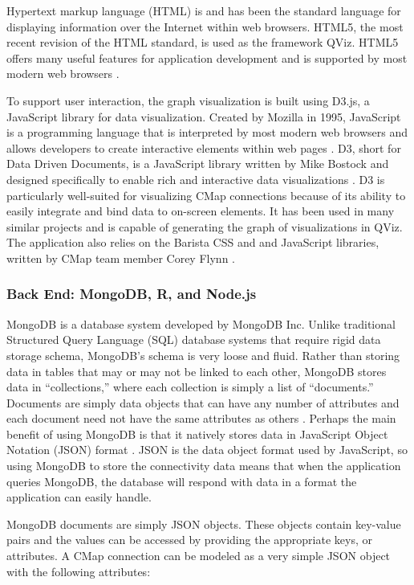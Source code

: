 \documentclass[12pt]{article}
\begin{document}
Hypertext markup language (HTML) is and has been the standard language for displaying information over the Internet within web browsers. HTML5, the most recent revision of the HTML standard, is used as the framework QViz. HTML5 offers many useful features for application development and is supported by most modern web browsers \cite{w3c_html5}. 

To support user interaction, the graph visualization is built using D3.js, a JavaScript library for data visualization. Created by Mozilla in 1995, JavaScript is a programming language that is interpreted by most modern web browsers and allows developers to create interactive elements within web pages \cite{mozilla_javascript}. D3, short for Data Driven Documents, is a JavaScript library written by Mike Bostock and designed specifically to enable rich and interactive data visualizations \cite{bostock_d3}. D3 is particularly well-suited for visualizing CMap connections because of its ability to easily integrate and bind data to on-screen elements. It has been used in many similar projects and is capable of generating the graph of visualizations in QViz. The application also relies on the Barista CSS and and JavaScript libraries, written by CMap team member Corey Flynn \cite{barista}.


\subsubsection{Back End: MongoDB, R, and Node.js}

MongoDB is a database system developed by MongoDB Inc. Unlike traditional Structured Query Language (SQL) database systems that require rigid data storage schema, MongoDB's schema is very loose and fluid. Rather than storing data in tables that may or may not be linked to each other, MongoDB stores data in ``collections,'' where each collection is simply a list of ``documents.'' Documents are simply data objects that can have any number of attributes and each document need not have the same attributes as others \cite{mongodb}. Perhaps the main benefit of using MongoDB is that it natively stores data in JavaScript Object Notation (JSON) format \cite{json}. JSON is the data object format used by JavaScript, so using MongoDB to store the connectivity data means that when the application queries MongoDB, the database will respond with data in a format the application can easily handle.

MongoDB documents are simply JSON objects. These objects contain key-value pairs and the values can be accessed by providing the appropriate keys, or attributes. A CMap connection can be modeled as a very simple JSON object with the following attributes:
\end{document}
